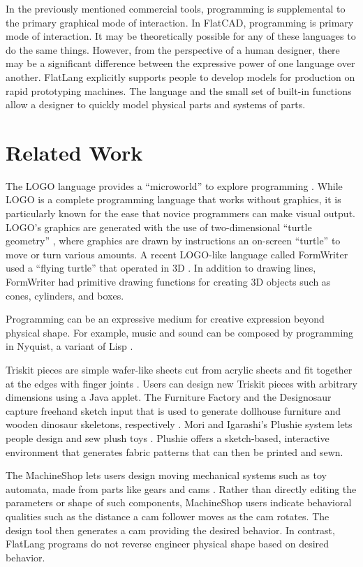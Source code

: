 \documentclass[times, 10pt,twocolumn]{article}
\begin{document}
In the previously mentioned commercial tools, programming is
supplemental to the primary graphical mode of interaction. In
\nohyphens{FlatCAD}, programming is primary mode of interaction. It
may be theoretically possible for any of these languages to do the
same things. However, from the perspective of a human designer, there
may be a significant difference between the expressive power of one
language over another. \nohyphens{FlatLang} explicitly supports people
to develop models for production on rapid prototyping machines.  The
language and the small set of built-in functions allow a designer to
quickly model physical parts and systems of parts.

\section{Related Work}

The LOGO language provides a ``microworld'' to explore programming
\cite{papert-mindstorms}. While LOGO is a complete programming
language that works without graphics, it is particularly known for the
ease that novice programmers can make visual output. LOGO's graphics
are generated with the use of two-dimensional ``turtle geometry''
\cite{abelson-turtle-geometry}, where graphics are drawn by
instructions an on-screen ``turtle'' to move or turn various
amounts. A recent LOGO-like language called FormWriter used a ``flying
turtle'' that operated in 3D \cite{gross-formwriter}. In addition to
drawing lines, FormWriter had primitive drawing functions for creating
3D objects such as cones, cylinders, and boxes. 

Programming can be an expressive medium for creative expression beyond
physical shape. For example, music and sound can be composed by
programming in Nyquist, a variant of Lisp \cite{dannenberg-nyquist}.

Triskit pieces are simple wafer-like sheets cut from acrylic sheets
and fit together at the edges with finger joints
\cite{martin-triskit}. Users can design new Triskit pieces with
arbitrary dimensions using a Java applet. The Furniture Factory and
the Designosaur capture freehand sketch input that is used to generate
dollhouse furniture and wooden dinosaur skeletons, respectively
\cite{oh-fab}. Mori and Igarashi's Plushie system lets people design
and sew plush toys \cite{mori-plushie}. Plushie offers a sketch-based,
interactive environment that generates fabric patterns that can then
be printed and sewn.

The MachineShop lets users design moving mechanical systems such as
toy automata, made from parts like gears and cams
\cite{blauvelt-automata}. Rather than directly editing the parameters
or shape of such components, MachineShop users indicate behavioral
qualities such as the distance a cam follower moves as the cam
rotates. The design tool then generates a cam providing the desired
behavior. In contrast, \nohyphens{FlatLang} programs do not reverse
engineer physical shape based on desired behavior.
\end{document}
